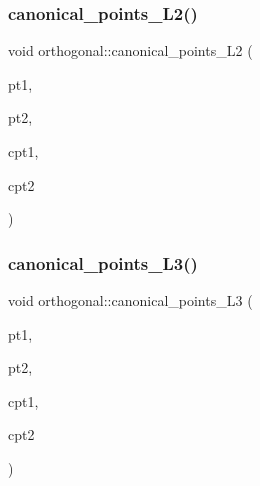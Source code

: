 \subsubsection{\texorpdfstring{canonical\+\_\+points\+\_\+\+L2()}{canonical\_points\_L2()}}
{\footnotesize\ttfamily void orthogonal\+::canonical\+\_\+points\+\_\+\+L2 (\begin{DoxyParamCaption}\item[{\mbox{\hyperlink{galois_8h_a09fddde158a3a20bd2dcadb609de11dc}{I\+NT}}}]{pt1,  }\item[{\mbox{\hyperlink{galois_8h_a09fddde158a3a20bd2dcadb609de11dc}{I\+NT}}}]{pt2,  }\item[{\mbox{\hyperlink{galois_8h_a09fddde158a3a20bd2dcadb609de11dc}{I\+NT}} \&}]{cpt1,  }\item[{\mbox{\hyperlink{galois_8h_a09fddde158a3a20bd2dcadb609de11dc}{I\+NT}} \&}]{cpt2 }\end{DoxyParamCaption})}

\mbox{\label{classorthogonal_a706d414327180dca2f7409133ff01034}} 
\subsubsection{\texorpdfstring{canonical\+\_\+points\+\_\+\+L3()}{canonical\_points\_L3()}}
{\footnotesize\ttfamily void orthogonal\+::canonical\+\_\+points\+\_\+\+L3 (\begin{DoxyParamCaption}\item[{\mbox{\hyperlink{galois_8h_a09fddde158a3a20bd2dcadb609de11dc}{I\+NT}}}]{pt1,  }\item[{\mbox{\hyperlink{galois_8h_a09fddde158a3a20bd2dcadb609de11dc}{I\+NT}}}]{pt2,  }\item[{\mbox{\hyperlink{galois_8h_a09fddde158a3a20bd2dcadb609de11dc}{I\+NT}} \&}]{cpt1,  }\item[{\mbox{\hyperlink{galois_8h_a09fddde158a3a20bd2dcadb609de11dc}{I\+NT}} \&}]{cpt2 }\end{DoxyParamCaption})}

\mbox{\label{classorthogonal_a400c2285049c26bfe678d9f7b2b1da82}} 
